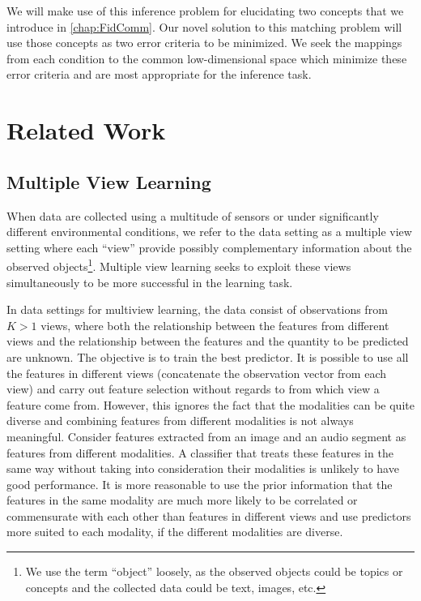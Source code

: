 \documentclass[12pt,oneside,final]{thesis}
\begin{document}
We will make use of this inference problem for elucidating two concepts that we introduce  in \autoref{chap:FidComm}. Our novel solution to this matching problem will use those concepts as two error criteria to be minimized. We seek the mappings from each condition to the common low-dimensional space which  minimize these error criteria and are  most appropriate for the inference task.




\chapter{Related Work}
\label{chap:RelatedWork}



\section{Multiple View Learning}
\label{sec:MultiViewLearn}
When data are collected using a multitude of sensors or under significantly different environmental conditions, we refer to  the data setting as a multiple view setting where each ``view'' provide possibly complementary  information about the observed objects\footnote{We use the term ``object''  loosely, as the observed objects could be topics or concepts and the  collected data could be text, images, etc.}. Multiple view learning seeks to exploit these views simultaneously to be more successful in the learning task.

In data settings for multiview learning, the data consist of observations from $K>1$ views, where both the relationship between the features from different views and the relationship between the features and the quantity to be predicted are unknown. The objective is to train the best predictor. It is possible to use all the features in different views (\ie concatenate the observation vector from each view)  and carry out feature selection without regards to from which view a feature come from. However, this ignores the fact that the modalities can be quite diverse and combining features from different modalities is not always meaningful. Consider features extracted from an image  and an audio segment as features from different modalities. A classifier that treats these features in the same way without taking into consideration their modalities is  unlikely to have good performance.
It is more reasonable to use the prior information that the features in the same modality are much more likely to be correlated or commensurate with each other than features in different views and use predictors more suited to each modality, if the different modalities are diverse.
\end{document}
